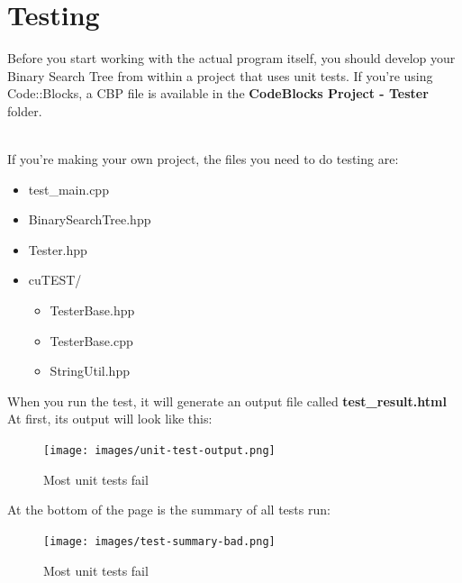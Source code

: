 \documentclass[a4paper,12pt,oneside]{book}
\begin{document}
    \newpage

    \section{Testing}

    Before you start working with the actual program itself, you should
    develop your Binary Search Tree from within a project that uses
    unit tests.
    If you're using Code::Blocks, a CBP file is available in the
    \textbf{CodeBlocks Project - Tester} folder.

    ~\\
    If you're making your own project, the files you need to do testing are:

    \begin{itemize}
        \item   test\_main.cpp
        \item   BinarySearchTree.hpp
        \item   Tester.hpp
        \item   cuTEST/
        \begin{itemize}
            \item   TesterBase.hpp
            \item   TesterBase.cpp
            \item   StringUtil.hpp
        \end{itemize}
    \end{itemize}

    When you run the test, it will generate an output file called
    \textbf{test\_result.html} At first, its output will look like this:

    \begin{figure}[h]
        \center
        \texttt{[image: images/unit-test-output.png]}
        \caption{Most unit tests fail}
    \end{figure}

    \newpage

    At the bottom of the page is the summary of all tests run:
    
    \begin{figure}[h]
        \center
        \texttt{[image: images/test-summary-bad.png]}
        \caption{Most unit tests fail}
    \end{figure}
\end{document}

